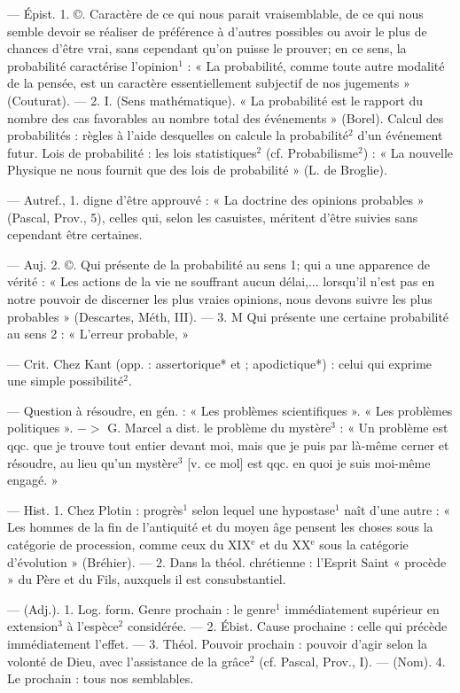 \begin{itemize}[leftmargin=1cm, label=, itemsep=1pt]
 — Épist. 1. ©. Caractère
de ce qui nous parait vraisemblable,
de ce qui nous semble devoir se
réaliser de préférence à d’autres
possibles ou avoir le plus de chances
d’être vrai, sans cependant qu’on
puisse le prouver; en ce sens, la
probabilité caractérise l’opinion$^1$ :
« La probabilité, comme toute autre
modalité de la pensée, est un caractère essentiellement subjectif de nos
jugements » (Couturat). — 2. I.
(Sens mathématique). « La probabilité est le rapport du nombre des
cas favorables au nombre total des
événements » (Borel). Calcul des
probabilités : règles à l'aide desquelles on calcule la probabilité$^2$
d’un événement futur. Lois de probabilité : les lois statistiques$^2$ (cf.
Probabilisme$^2$) : « La nouvelle Physique ne nous fournit que des lois de
probabilité » (L. de Broglie).

 — Autref., 1. digne d'être
approuvé : « La doctrine des opinions probables » (Pascal, Prov., 5),
celles qui, selon les casuistes, méritent d’être suivies sans cependant
être certaines.

— Auj. 2. ©. Qui présente de la
probabilité au sens 1; qui a une
apparence de vérité : « Les actions
de la vie ne souffrant aucun délai,...
lorsqu'il n’est pas en notre pouvoir
de discerner les plus vraies opinions,
nous devons suivre les plus probables » (Descartes, Méth, III). —
3. M Qui présente une certaine probabilité au sens 2 : « L'erreur probable, »

 — Crit.
Chez Kant (opp. : assertorique* et ;
apodictique*) : celui qui exprime une
simple possibilité$^2$.

 — Question à résoudre, en
gén. : « Les problèmes scientifiques ».
« Les problèmes politiques ». $->$
G. Marcel a dist. le problème du
mystère$^3$ : « Un problème est qqc. que
je trouve tout entier devant moi,
mais que je puis par là-même cerner
et résoudre, au lieu qu’un mystère$^3$
[v. ce mol] est qqc. en quoi je suis
moi-même engagé. »

 — Hist. 1. Chez Plotin :
progrès$^1$ selon lequel une hypostase$^1$
naît d’une autre : « Les hommes
de la fin de l'antiquité et du moyen
âge pensent les choses sous la catégorie
de procession, comme ceux
du {\footnotesize XIX}$^\text{e}$ et du {\footnotesize XX}$^\text{e}$ sous la catégorie
d'évolution » (Bréhier). — 2. Dans
la théol. chrétienne : l'Esprit Saint
« procède » du Père et du Fils, auxquels il est consubstantiel.

 — (Adj.). 1. Log. form.
Genre prochain : le genre$^1$ immédiatement supérieur en extension$^3$
à l'espèce$^2$ considérée. — 2. Ébist.
Cause prochaine : celle qui précède
immédiatement l'effet. — 3. Théol.
Pouvoir prochain : pouvoir d’agir
selon la volonté de Dieu, avec l’assistance de la grâce$^2$ (cf. Pascal, Prov.,
I). — (Nom). 4. Le prochain : tous
nos semblables.


\end{itemize}
